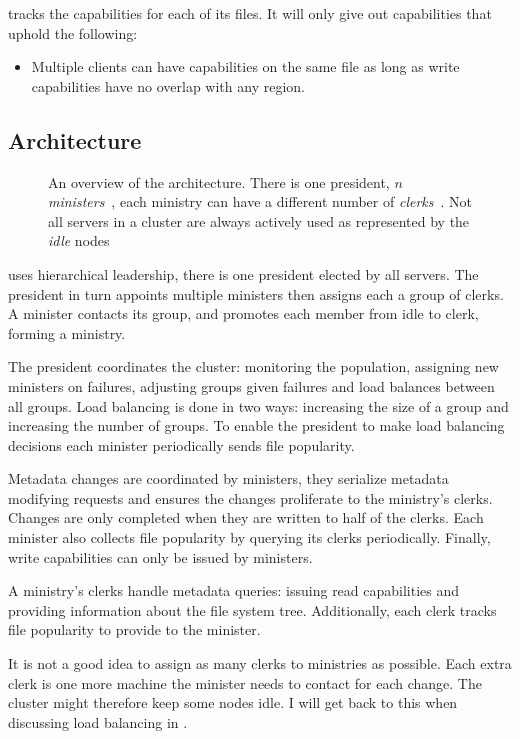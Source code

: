 \begin{samepage}
\Name{} tracks the capabilities for each of its files. It will only give out capabilities that uphold the following:
%
\begin{itemize}
	\item Multiple clients can have capabilities on the same file as long as write capabilities have no overlap with any region.
\end{itemize}
\end{samepage}
% 
\subsection{Architecture} \label{sec:arch}
\begin{figure}
	
	\caption{An overview of the architecture. There is one president, $n$ \emph{ministers}~\amdsLeg{}, each ministry can have a different number of \emph{clerks}~\cmdsLeg{}. Not all servers in a cluster are always actively used as represented by the \emph{idle} nodes~\umdsLeg{}}
\end{figure}

\Name{} uses hierarchical leadership, there is one president elected by all servers. The president in turn appoints multiple ministers then assigns each a group of clerks. A minister contacts its group, and promotes each member from idle to clerk, forming a ministry. 

The president coordinates the cluster: monitoring the population, assigning new ministers on failures, adjusting groups given failures and load balances between all groups. Load balancing is done in two ways: increasing the size of a group and increasing the number of groups. To enable the president to make load balancing decisions each minister periodically sends file popularity.

Metadata changes are coordinated by ministers, they serialize metadata modifying requests and ensures the changes proliferate to the ministry's clerks. Changes are only completed when they are written to half of the clerks. Each minister also collects file popularity by querying its clerks periodically. Finally, write capabilities can only be issued by ministers.

A ministry's clerks handle metadata queries: issuing read capabilities and providing information about the file system tree. Additionally, each clerk tracks file popularity to provide to the minister. 

It is not a good idea to assign as many clerks to ministries as possible. Each extra clerk is one more machine the minister needs to contact for each change. The cluster might therefore keep some nodes idle. I will get back to this when discussing load balancing in .
%
